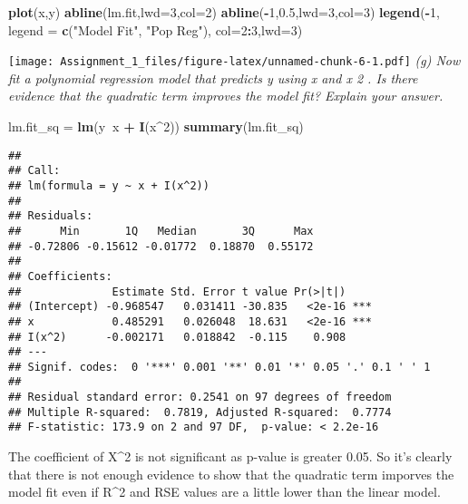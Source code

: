 \documentclass[]{article}
\newenvironment{Shaded}{\begin{snugshade}}{\end{snugshade}}
\newcommand{\KeywordTok}[1]{\textcolor[rgb]{0.13,0.29,0.53}{\textbf{#1}}}
\newcommand{\DataTypeTok}[1]{\textcolor[rgb]{0.13,0.29,0.53}{#1}}
\newcommand{\DecValTok}[1]{\textcolor[rgb]{0.00,0.00,0.81}{#1}}
\newcommand{\FloatTok}[1]{\textcolor[rgb]{0.00,0.00,0.81}{#1}}
\newcommand{\StringTok}[1]{\textcolor[rgb]{0.31,0.60,0.02}{#1}}
\newcommand{\OperatorTok}[1]{\textcolor[rgb]{0.81,0.36,0.00}{\textbf{#1}}}
\newcommand{\NormalTok}[1]{#1}
\begin{document}
\begin{Shaded}
\begin{Highlighting}[]
\KeywordTok{plot}\NormalTok{(x,y)}
\KeywordTok{abline}\NormalTok{(lm.fit,}\DataTypeTok{lwd=}\DecValTok{3}\NormalTok{,}\DataTypeTok{col=}\DecValTok{2}\NormalTok{)}
\KeywordTok{abline}\NormalTok{(}\OperatorTok{-}\DecValTok{1}\NormalTok{,}\FloatTok{0.5}\NormalTok{,}\DataTypeTok{lwd=}\DecValTok{3}\NormalTok{,}\DataTypeTok{col=}\DecValTok{3}\NormalTok{)}
\KeywordTok{legend}\NormalTok{(}\OperatorTok{-}\DecValTok{1}\NormalTok{, }\DataTypeTok{legend =} \KeywordTok{c}\NormalTok{(}\StringTok{"Model Fit"}\NormalTok{, }\StringTok{"Pop Reg"}\NormalTok{), }\DataTypeTok{col=}\DecValTok{2}\OperatorTok{:}\DecValTok{3}\NormalTok{,}\DataTypeTok{lwd=}\DecValTok{3}\NormalTok{)}
\end{Highlighting}
\end{Shaded}

\texttt{[image: Assignment\_1\_files/figure-latex/unnamed-chunk-6-1.pdf]}
\emph{(g) Now fit a polynomial regression model that predicts y using x
and x 2 . Is there evidence that the quadratic term improves the model
fit? Explain your answer.}

\begin{Shaded}
\begin{Highlighting}[]
\NormalTok{lm.fit_sq =}\StringTok{ }\KeywordTok{lm}\NormalTok{(y}\OperatorTok{~}\NormalTok{x }\OperatorTok{+}\StringTok{ }\KeywordTok{I}\NormalTok{(x}\OperatorTok{^}\DecValTok{2}\NormalTok{))}
\KeywordTok{summary}\NormalTok{(lm.fit_sq)}
\end{Highlighting}
\end{Shaded}

\begin{verbatim}
## 
## Call:
## lm(formula = y ~ x + I(x^2))
## 
## Residuals:
##      Min       1Q   Median       3Q      Max 
## -0.72806 -0.15612 -0.01772  0.18870  0.55172 
## 
## Coefficients:
##              Estimate Std. Error t value Pr(>|t|)    
## (Intercept) -0.968547   0.031411 -30.835   <2e-16 ***
## x            0.485291   0.026048  18.631   <2e-16 ***
## I(x^2)      -0.002171   0.018842  -0.115    0.908    
## ---
## Signif. codes:  0 '***' 0.001 '**' 0.01 '*' 0.05 '.' 0.1 ' ' 1
## 
## Residual standard error: 0.2541 on 97 degrees of freedom
## Multiple R-squared:  0.7819, Adjusted R-squared:  0.7774 
## F-statistic: 173.9 on 2 and 97 DF,  p-value: < 2.2e-16
\end{verbatim}

The coefficient of X\^{}2 is not significant as p-value is greater 0.05.
So it's clearly that there is not enough evidence to show that the
quadratic term imporves the model fit even if R\^{}2 and RSE values are
a little lower than the linear model.
\end{document}
